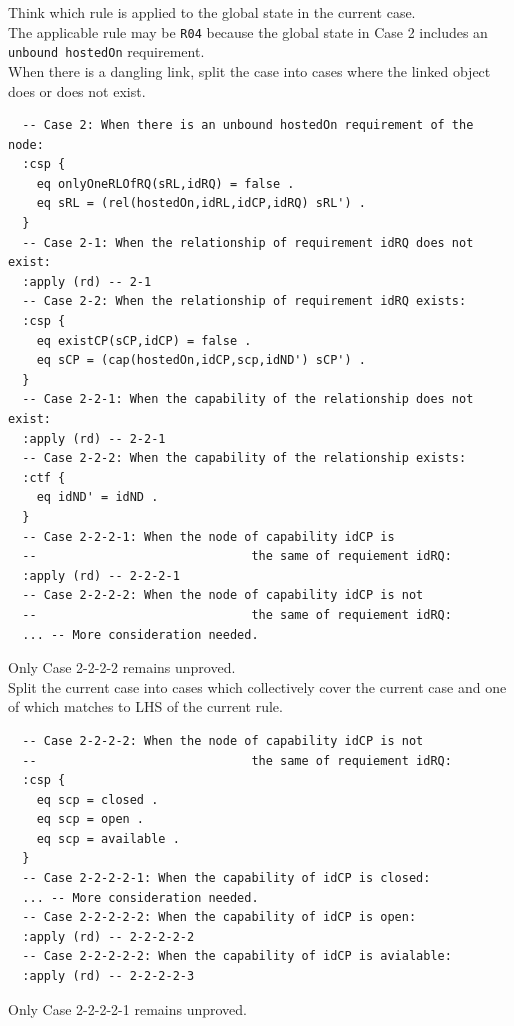 \documentclass[12pt]{report}
\begin{document}
 Think which rule is applied to the 
global state in the current case. \\
The applicable rule may be {\tt R04} because the global state in Case
2 includes an {\tt unbound hostedOn} requirement.\\

 When there is a dangling link, split the case
into cases where the linked object does or does not exist.
\small
\begin{verbatim}
  -- Case 2: When there is an unbound hostedOn requirement of the node:
  :csp {
    eq onlyOneRLOfRQ(sRL,idRQ) = false .
    eq sRL = (rel(hostedOn,idRL,idCP,idRQ) sRL') .
  }
  -- Case 2-1: When the relationship of requirement idRQ does not exist:
  :apply (rd) -- 2-1
  -- Case 2-2: When the relationship of requirement idRQ exists:
  :csp {
    eq existCP(sCP,idCP) = false .
    eq sCP = (cap(hostedOn,idCP,scp,idND') sCP') .
  }
  -- Case 2-2-1: When the capability of the relationship does not exist:
  :apply (rd) -- 2-2-1
  -- Case 2-2-2: When the capability of the relationship exists:
  :ctf {
    eq idND' = idND .
  }
  -- Case 2-2-2-1: When the node of capability idCP is
  --                              the same of requiement idRQ:
  :apply (rd) -- 2-2-2-1
  -- Case 2-2-2-2: When the node of capability idCP is not
  --                              the same of requiement idRQ:
  ... -- More consideration needed.
\end{verbatim}
\normalsize
Only Case 2-2-2-2 remains unproved.\\

 Split the current case into cases which
collectively cover the current case and one of which matches to LHS of
the current rule. 
\small
\begin{verbatim}
  -- Case 2-2-2-2: When the node of capability idCP is not
  --                              the same of requiement idRQ:
  :csp {
    eq scp = closed .
    eq scp = open .
    eq scp = available .
  }
  -- Case 2-2-2-2-1: When the capability of idCP is closed:
  ... -- More consideration needed.
  -- Case 2-2-2-2-2: When the capability of idCP is open:
  :apply (rd) -- 2-2-2-2-2
  -- Case 2-2-2-2-2: When the capability of idCP is avialable:
  :apply (rd) -- 2-2-2-2-3
\end{verbatim}
\normalsize
Only Case 2-2-2-2-1 remains unproved.\\
\end{document}
